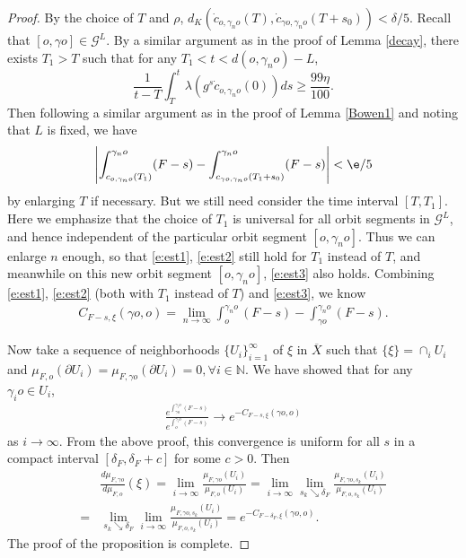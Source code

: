 \documentclass[11pt]{amsart}
\theoremstyle{definition}
\newcommand{\GGG}{\mathcal{G}}
\def\NN{{\mathbb N}}
\def\c{\gamma}   \def\C{\Gamma}
\def\d{\delta}   %
\begin{document}
\begin{proof}
By the choice of $T$ and $\rho$, $d_K(\dot c_{o,\c_n o}(T),\dot c_{\c o,\c_n o}(T+s_0))<\d/5$.
Recall that $[o,\c o]\in \GGG^L$. By a similar argument as in the proof of Lemma \ref{decay}, there exists $T_1>T$ such that for any $T_1<t<d(o,\c_no)-L$,
\[\frac{1}{t-T}\int_T^t\lambda(g^s \dot c_{o,\c_n o}(0))ds\ge \frac{99\eta}{100}.\]
Then following a similar argument as in the proof of Lemma \ref{Bowen1} and noting that $L$ is fixed, we have
\begin{equation}\label{e:est3}
\begin{aligned}
\left|\int_{c_{o,\c_n o}(T_1)}^{\c_n o}(F-s)-\int_{c_{\c o,\c_n o}(T_1+s_0)}^{\c_n o}(F-s)\right|<\e/5
\end{aligned}
\end{equation}
by enlarging $T$ if necessary. But we still need consider the time interval $[T,T_1]$. Here we emphasize that the choice of $T_1$ is universal for all orbit segments in $\GGG^L$, and hence independent of the particular orbit segment $[o,\c_n o]$. Thus we can enlarge $n$ enough, so that  \eqref{e:est1}, \eqref{e:est2} still hold for $T_1$ instead of $T$, and meanwhile on this new orbit segment $[o,\c_n o]$, \eqref{e:est3} also holds.
Combining \eqref{e:est1}, \eqref{e:est2} (both with $T_1$ instead of $T$) and \eqref{e:est3}, we know
\begin{equation*}
\begin{aligned}
C_{F-s,\xi}(\c o,o)=\lim_{n\to \infty }\int_{o}^{\c_n o}(F-s)-\int_{\c o}^{\c_n o}(F-s).
\end{aligned}
\end{equation*}

Now take a sequence of neighborhoods $\{U_i\}_{i=1}^\infty$ of $\xi$ in $\overline X$ such that $\{\xi\}=\cap_{i} U_i$ and $\mu_{F,o}(\partial U_i)=\mu_{F,\c o}(\partial U_i)=0, \forall i\in \NN$. We have showed that for any $\c_i o\in U_i$,
\begin{equation*}
\begin{aligned}
\frac{e^{\int_{\c o}^{\c_i o}(F-s)}}{e^{\int_{o}^{\c_i o}(F-s)}}\to e^{-C_{F-s,\xi}(\c o,o)}
\end{aligned}
\end{equation*}
as $i\to \infty$. From the above proof, this convergence is uniform for all $s$ in a compact interval $[\d_F, \d_F+c]$ for some $c>0$.
Then
\begin{equation*}
\begin{aligned}
&\frac{d\mu_{F,\c o}}{d\mu_{F,o}}(\xi)=\lim_{i\to \infty}\frac{\mu_{F, \c o}(U_i)}{\mu_{F, o}(U_i)}=\lim_{i\to \infty}\lim_{s_k\searrow \d_F}\frac{\mu_{F, \c o,s_k}(U_i)}{\mu_{F, o,s_k}(U_i)}\\
=&\lim_{s_k\searrow \d_F}\lim_{i\to \infty}\frac{\mu_{F, \c o,s_k}(U_i)}{\mu_{F, o,s_k}(U_i)}=e^{-C_{F-\d_F,\xi}(\c o, o)}.
\end{aligned}
\end{equation*}
The proof of the proposition is complete.
\end{proof}
\end{document}
